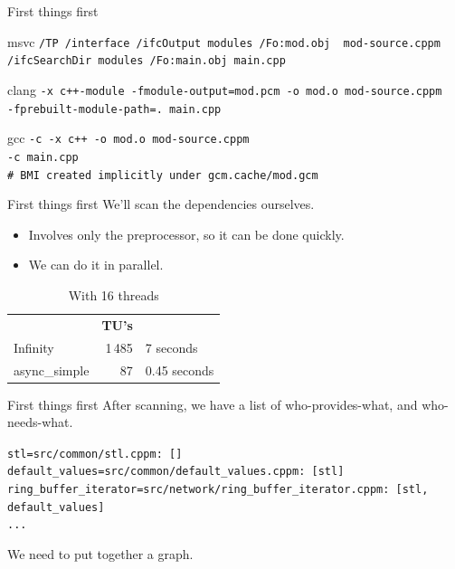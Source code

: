 \documentclass[aspectratio=169]{beamer}
\begin{document}
\begin{frame}{First things first}
  \begin{block}{msvc }
    \footnotesize{
    \texttt{/TP /interface {\color{magenta}/ifcOutput modules} /Fo:mod.obj {\color{blue} mod-source.cppm}} \\
    \texttt{{\color{magenta}/ifcSearchDir modules} /Fo:main.obj main.cpp}
    }
  \end{block}
  \begin{block}{clang }
    \footnotesize{
    \texttt{-x c++-module -fmodule-output={\color{red}mod.pcm} -o mod.o {\color{blue}mod-source.cppm}} \\
    \texttt{{\color{magenta}-fprebuilt-module-path=.} main.cpp}
    }
  \end{block}
  \begin{block}{gcc }
    \footnotesize{
    \texttt{-c -x c++ -o mod.o mod-source.cppm} \\
    \texttt{-c main.cpp} \\
    {\color{teal}\texttt{\# BMI created implicitly under \texttt{gcm.cache/mod.gcm}}}
    }
  \end{block}
\end{frame}

\begin{frame}{First things first}
  We'll scan the dependencies ourselves.
  \begin{itemize}
    \item Involves only the preprocessor, so it can be done quickly.
    \item We can do it in parallel.
  \end{itemize}
  \begin{table}
    \begin{tabular}{l r l}
                    & \textbf{TU's} &              \\
      Infinity      & 1\,485        & 7 seconds    \\
      async\_simple & 87            & 0.45 seconds
    \end{tabular}
    \caption*{With 16 threads}
  \end{table}
\end{frame}

\begin{frame}[fragile]{First things first}
  After scanning, we have a list of who-provides-what, and who-needs-what.
  \begin{block}{}
    \footnotesize{
    \texttt{{\color{blue}stl}=src/common/stl.cppm: []\\
    {\color{blue}default\_values}=src/common/default\_values.cppm: [{\color{purple}stl}]\\
    {\color{blue}ring\_buffer\_iterator}=src/network/ring\_buffer\_iterator.cppm: [{\color{purple}stl, default\_values}]\\
    ...}
    }
  \end{block}
  We need to put together a graph.
\end{frame}
\end{document}
